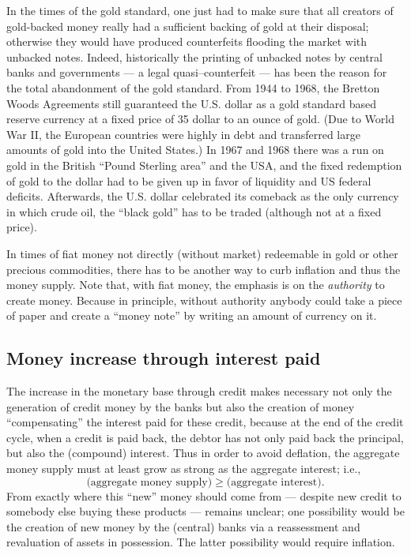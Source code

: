 \documentclass[aps,rmp,preprint,amsfonts,showpacs,showkeys]{revtex4}
\begin{document}
In the times of the gold standard, one just had to make sure that all
creators of gold-backed money really had a sufficient backing of gold at their disposal;
otherwise they would have produced counterfeits flooding the market with unbacked notes.
Indeed, historically the printing of unbacked notes by central banks and governments --- a legal quasi--counterfeit --- has been the reason
for the total abandonment of the gold standard.
From 1944 to 1968, the Bretton Woods Agreements still guaranteed the U.S. dollar as a  gold standard based
reserve currency at a fixed price of 35 dollar to an ounce of gold.
(Due to World War II, the European countries were highly in debt and transferred large amounts of gold into the United States.)
In 1967 and 1968  there was a run on gold in the British ``Pound Sterling area'' and the USA,
and the fixed redemption of gold to the dollar had to be given up in favor of liquidity and US federal deficits.
Afterwards, the U.S. dollar celebrated its comeback as the only currency in which crude oil, the ``black gold'' has to be traded (although not at a fixed price).


In times of fiat money not directly (without market) redeemable in gold or other precious commodities, there has to be another
way to curb inflation and thus the money supply.
Note that, with fiat money, the emphasis is on the {\em authority} to create money.
Because in principle, without authority anybody could take a piece of paper and
create a ``money note'' by writing an amount of currency on it.

\subsection{Money increase through interest paid}

The increase in the monetary base through credit makes necessary not only the generation of credit money by the banks
but also the creation of money ``compensating'' the interest paid for these credit,
because at the end of the credit cycle, when a credit is paid back,
the debtor has not only paid back the principal, but also the (compound) interest.
Thus  in order to avoid deflation, the aggregate money supply must at least grow as strong as the aggregate interest; i.e.,
$$
\mbox{(aggregate money supply)}
\ge
\mbox{(aggregate interest)}
.
$$
From exactly where this ``new'' money should come from --- despite new credit to somebody else buying these products ---
remains unclear; one possibility would be the creation of new money by the (central) banks via a reassessment and revaluation of assets in possession.
The latter possibility would require inflation.
\end{document}
